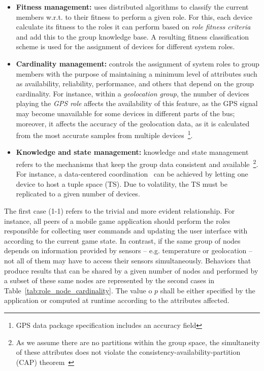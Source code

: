 \begin{itemize}
	
	\item \textbf{Fitness management:} uses distributed algorithms to classify the current members w.r.t. to their fitness to perform a given role. For this, each device calculate its fitness to the roles it can perform based on \textit{role fitness criteria} and add this to the group knowledge base. A resulting fitness classification scheme is used for the assignment of devices for different system roles.
	
	\item \textbf{Cardinality management:} controls the assignment of system roles to group members with the purpose of maintaining a minimum level of attributes such as availability, reliability, performance, and others that depend on the group cardinality. For instance, within a \textit{geolocation group}, the number of devices playing the \textit{GPS role} affects the availability of this feature, as the GPS signal may become unavailable for some devices in different parts of the bus; moreover, it affects the accuracy of the geolocation data, as it is calculated from the most accurate samples from multiple devices~\footnote{GPS data package specification includes an accuracy field}.
	
	\item \textbf{Knowledge and state management:} knowledge and state management refers to the mechanisms that keep the group data consistent and available~\footnote{As we  assume there are no partitions within the group space, the simultaneity of these attributes does not violate the consistency-availability-partition (CAP) theorem~\cite{CAP}}. For instance, a data-centered coordination~\cite{} can be achieved by letting one device to host a tuple space (TS). Due to volatility, the TS must be replicated to a given number of devices.
	
\end{itemize}

The first case (1-1) refers to the trivial and more evident relationship. For instance, all peers of a mobile game application should perform the roles responsible for collecting user commands and updating the user interface with according to the current game state. In contrast, if the same group of nodes depends on information provided by sensors -- e.g. temperature or geolocation -- not all of them may have to access their sensors simultaneously. 
Behaviors that produce results that can be shared by a given number of nodes and performed by a subset of these same nodes are represented by the second cases in Table~\ref{tab:role_node_cardinality}. The value o $p$ shall be either specified by the application or computed at runtime according to the attributes affected.

